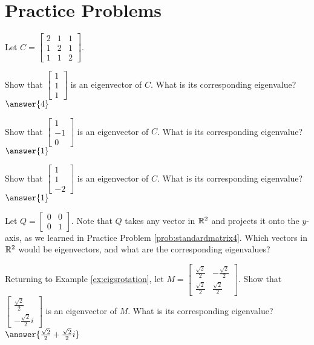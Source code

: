 \documentclass{ximera}
\begin{document}
\section*{Practice Problems}

\begin{problem}Let $C=\begin{bmatrix} 2 & 1 & 1\\ 1 & 2 & 1\\ 1 & 1 & 2\end{bmatrix}$.  \begin{problem}\label{prob:checkeig1}
Show that $\begin{bmatrix} 1\\1\\1 \end{bmatrix}$ is an eigenvector of $C$.  What is its corresponding eigenvalue?
$\answer{4}$
\end{problem}
 \begin{problem}\label{prob:checkeig2}
Show that $\begin{bmatrix} 1\\-1\\0 \end{bmatrix}$ is an eigenvector of $C$.  What is its corresponding eigenvalue?
$\answer{1}$
\end{problem}
 \begin{problem}\label{prob:checkeig3}
Show that $\begin{bmatrix} 1\\1\\-2 \end{bmatrix}$ is an eigenvector of $C$.  What is its corresponding eigenvalue?
$\answer{1}$
\end{problem}
\end{problem}



\begin{problem}\label{prob:eigprojmatrix} Let $Q=\begin{bmatrix} 0& 0\\ 0&1\end{bmatrix}$.  Note that $Q$ takes any vector in $\mathbb{R}^2$ and projects it onto the $y$-axis, as we learned in Practice Problem \ref{prob:standardmatrix4}.  Which vectors in $\mathbb{R}^2$ would be eigenvectors, and what are the corresponding eigenvalues?
\end{problem}

 
\begin{problem}\label{ex:eigsrotation2}
Returning to Example \ref{ex:eigsrotation}, let $M=\begin{bmatrix}
\frac{\sqrt{2}}{2} & -\frac{\sqrt{2}}{2}\\
\frac{\sqrt{2}}{2} & \frac{\sqrt{2}}{2}
\end{bmatrix}$.  Show that $\begin{bmatrix} \frac{\sqrt{2}}{2}\\ -\frac{\sqrt{2}}{2} i \end{bmatrix}$ is an eigenvector of $M$.  What is its corresponding eigenvalue?
$\answer{\frac{\sqrt{2}}{2}+\frac{\sqrt{2}}{2}i}$
\end{problem}
\end{document}

